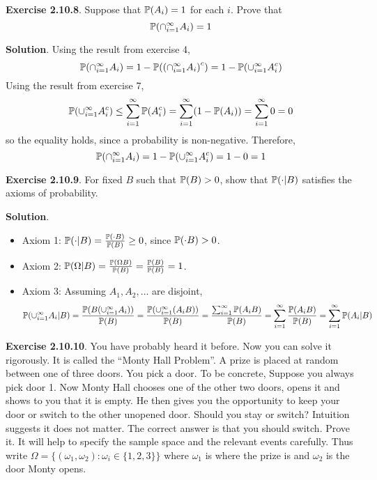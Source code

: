 \textbf{Exercise 2.10.8}. Suppose that \(\operatorname{\mathbb{P}}(A_{i}) = 1\) for each
\(i\). Prove that
\[
\PROB\left( \inter_{i=1}^{\infty} A_{i} \right) = 1 
\]

\textbf{Solution}. Using the result from exercise 4,
\[
\PROB\left( \inter_{i=1}^{\infty} A_{i} \right) = 1 - \PROB\left(\left( \inter_{i=1}^{\infty} A_{i} \right)^{c}\right)
= 1 - \PROB\left( \union_{i=1}^{\infty} A_{i}^{c} \right)
\]
Using the result from exercise 7,
\[
\PROB\left( \union_{i=1}^{\infty} A_{i}^{c} \right) \leq \sum_{i=1}^{\infty} \PROB(A_{i}^{c}) =  \sum_{i=1}^{\infty} \left(1 - \PROB\left( A_{i} \right) \right) = \sum_{i=1}^{\infty} 0 = 0 
\]
so the equality holds, since a probability is non-negative. Therefore,
\[
\PROB\left( \inter_{i=1}^{\infty} A_{i} \right) = 1 - \PROB\left( \union_{i=1}^{\infty} A_{i}^{c} \right) = 1 - 0 = 1 
\]

\textbf{Exercise 2.10.9}. For fixed \(B\) such that
\(\operatorname{\mathbb{P}}(B) > 0\), show that \(\operatorname{\mathbb{P}}(\cdot | B)\) satisfies the
axioms of probability.

\textbf{Solution}.
\begin{itemize}[tightlist]
\item
  Axiom 1:
  \(\operatorname{\mathbb{P}}(\cdot | B) = \frac{\operatorname{\mathbb{P}}(\cdot B)}{\operatorname{\mathbb{P}}(B)} \geq 0\),
  since \(\operatorname{\mathbb{P}}(\cdot B) > 0\).
\item
  Axiom 2:
  \(\operatorname{\mathbb{P}}(\Omega | B) =  \frac{\operatorname{\mathbb{P}}(\Omega B)}{\operatorname{\mathbb{P}}(B)} = \frac{\operatorname{\mathbb{P}}(B)}{\operatorname{\mathbb{P}}(B)} =1\).
\item
  Axiom 3: Assuming \(A_{1}, A_{2}, \dots\) are disjoint,
  \[
\PROB \left( \union_{i=1}^{\infty} A_{i} | B \right) = \frac{\PROB \left( B \left( \union_{i=1}^{\infty} A_{i} \right) \right)}{\PROB(B)} 
  =  \frac{\PROB\left( \union_{i=1}^{\infty} \left( A_{i} B \right) \right)}{\PROB(B)}
  = \frac{\sum_{i=1}^{\infty} \PROB(A_{i} B)}{\PROB(B)} = \sum_{i=1}^{\infty} \frac{\PROB(A_{i} B)}{\PROB(B)}
  = \sum_{i=1}^{\infty} \PROB(A_{i} | B)
\]
\end{itemize}

\textbf{Exercise 2.10.10}. You have probably heard it before. Now you can solve it rigorously. It is called the ``Monty Hall Problem''. A prize is placed at random between one of three doors. You pick a door. To be concrete, Suppose you always pick door 1. Now Monty Hall chooses one of the other two doors, opens it and shows to you that it is empty. He then gives you the opportunity to keep your door or switch to the other unopened door. Should you stay or switch? Intuition suggests it does not matter. The correct answer is that you should switch. Prove it. It will help to specify the sample space and the relevant events carefully. Thus write
\(\Omega = \{ (\omega_{1}, \omega_{2}) : \omega_{i} \in \{ 1, 2, 3 \} \}\)
where \(\omega_{1}\) is where the prize is and \(\omega_{2}\) is the door Monty opens.

